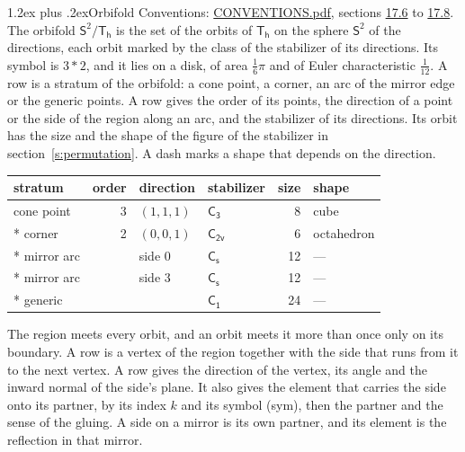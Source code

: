 \documentclass[10pt,a4paper]{article}
\makeatletter
\renewcommand\section{\@startsection{section}{1}{\z@}{-3ex plus -1ex minus -.2ex}%
  {1.2ex plus .2ex}{\normalfont\large\sffamily\bfseries\color{parttitle}}}
\numberwithin{equation}{section}
\newcommand{\grp}[1]{\mathsf{#1}}
\newcommand{\orbname}[1]{#1}
\newcommand{\dirvec}[3]{(#1, #2, #3)}
\newcommand{\twosphere}{\mathsf{S}^{2}}
\makeatother
\begin{document}
\section{Orbifold}\label{s:orbifold}
Conventions: \href{../../CONVENTIONS.pdf}{CONVENTIONS.pdf}, sections \href{../../CONVENTIONS.pdf\#conv.17.6}{17.6} to \href{../../CONVENTIONS.pdf\#conv.17.8}{17.8}.
The orbifold $\twosphere/\grp{T_{h}}$ is the set of the orbits of $\grp{T_{h}}$ on the sphere $\twosphere$ of the directions, each orbit marked by the class of the stabilizer of its directions. Its symbol is $\orbname{3{\ast}2}$, and it lies on a disk, of area $\tfrac{1}{6}\pi$ and of Euler characteristic $\tfrac{1}{12}$.
\leavevmode\label{n:head.stratum}\label{n:head.order.point}\label{n:head.direction}\label{n:head.stabilizer}\label{n:head.size.orbit}\label{n:head.shape}A row is a stratum of the orbifold: a cone point, a corner, an arc of the mirror edge or the generic points. A row gives the order of its points, the direction of a point or the side of the region along an arc, and the stabilizer of its directions. Its orbit has the size and the shape of the figure of the stabilizer in section~\ref{s:permutation}. A dash marks a shape that depends on the direction.
{\small\setlength{\tabcolsep}{4pt}\begin{longtable}{@{}lrllrl@{}}\toprule
stratum & order & direction & stabilizer & size & shape\\\midrule\endhead
\bottomrule\endfoot\endlastfoot
cone point & 3 & $\dirvec{1}{1}{1}$ & \href{C3.pdf}{$\grp{C_{3}}$} & 8 & cube\\*
corner & 2 & $\dirvec{0}{0}{1}$ & \href{C2v.pdf}{$\grp{C_{2v}}$} & 6 & octahedron\\*
mirror arc &  & side 0 & \href{C1v.pdf}{$\grp{C_{s}}$} & 12 & ---\\*
mirror arc &  & side 3 & \href{C1v.pdf}{$\grp{C_{s}}$} & 12 & ---\\*
generic &  &  & \href{C1.pdf}{$\grp{C_{1}}$} & 24 & ---\\
\bottomrule\end{longtable}}
\leavevmode\label{n:head.vertex.region}\label{n:head.angle}\label{n:head.normal.side}\label{n:head.partner}\label{n:head.sense}The region meets every orbit, and an orbit meets it more than once only on its boundary. A row is a vertex of the region together with the side that runs from it to the next vertex. A row gives the direction of the vertex, its angle and the inward normal of the side's plane. It also gives the element that carries the side onto its partner, by its index $k$ and its symbol (sym), then the partner and the sense of the gluing. A side on a mirror is its own partner, and its element is the reflection in that mirror.
\end{document}
